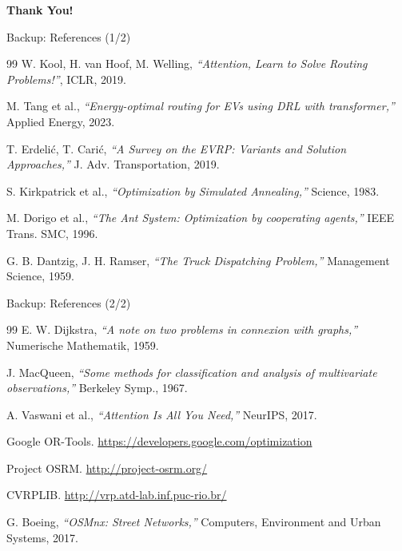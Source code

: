 \documentclass[aspectratio=169,11pt]{beamer}
\begin{document}
\begin{frame}[plain]
    \begin{center}
        \vspace{1cm}
        {\Huge\textbf{Thank You!}}
    \end{center}
\end{frame}

\begin{frame}{Backup: References (1/2)}
    \small
    \begin{thebibliography}{99}
        W. Kool, H. van Hoof, M. Welling,
        \textit{``Attention, Learn to Solve Routing Problems!''}, ICLR, 2019.

        M. Tang et al.,
        \textit{``Energy-optimal routing for EVs using DRL with transformer,''} Applied Energy, 2023.

        T. Erdeli\'{c}, T. Cari\'{c},
        \textit{``A Survey on the EVRP: Variants and Solution Approaches,''} J. Adv. Transportation, 2019.

        S. Kirkpatrick et al.,
        \textit{``Optimization by Simulated Annealing,''} Science, 1983.

        M. Dorigo et al.,
        \textit{``The Ant System: Optimization by cooperating agents,''} IEEE Trans. SMC, 1996.

        G. B. Dantzig, J. H. Ramser,
        \textit{``The Truck Dispatching Problem,''} Management Science, 1959.
    \end{thebibliography}
\end{frame}

\begin{frame}{Backup: References (2/2)}
    \small
    \begin{thebibliography}{99}
        E. W. Dijkstra,
        \textit{``A note on two problems in connexion with graphs,''} Numerische Mathematik, 1959.

        J. MacQueen,
        \textit{``Some methods for classification and analysis of multivariate observations,''} Berkeley Symp., 1967.

        A. Vaswani et al.,
        \textit{``Attention Is All You Need,''} NeurIPS, 2017.

        Google OR-Tools. \url{https://developers.google.com/optimization}

        Project OSRM. \url{http://project-osrm.org/}

        CVRPLIB. \url{http://vrp.atd-lab.inf.puc-rio.br/}

        G. Boeing, \textit{``OSMnx: Street Networks,''} Computers, Environment and Urban Systems, 2017.
    \end{thebibliography}
\end{frame}
\end{document}
